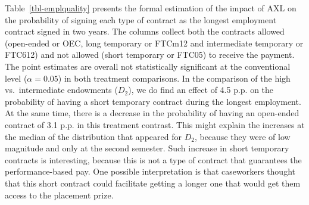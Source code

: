 \documentclass[
  11pt]{article}
\begin{document}
Table~\ref{tbl-emplquality} presents the formal estimation of the impact
of AXL on the probability of signing each type of contract as the
longest employment contract signed in two years. The columns collect
both the contracts allowed (open-ended or OEC, long temporary or FTCm12
and intermediate temporary or FTC612) and not allowed (short temporary
or FTC05) to receive the payment. The point estimates are overall not
statistically significant at the conventional level (\(\alpha=0.05\)) in
both treatment comparisons. In the comparison of the high
vs.~intermediate endowments (\(D_2\)), we do find an effect of 4.5 p.p.
on the probability of having a short temporary contract during the
longest employment. At the same time, there is a decrease in the
probability of having an open-ended contract of 3.1 p.p. in this
treatment contrast. This might explain the increases at the median of
the distribution that appeared for \(D_2\), because they were of low
magnitude and only at the second semester. Such increase in short
temporary contracts is interesting, because this is not a type of
contract that guarantees the performance-based pay. One possible
interpretation is that caseworkers thought that this short contract
could facilitate getting a longer one that would get them access to the
placement prize.

\begin{table}

\caption{\label{tbl-emplquality}Estimates of employment quality effects
for each treatment and contract of the longest employment spell.}


\end{table}%
\end{document}
